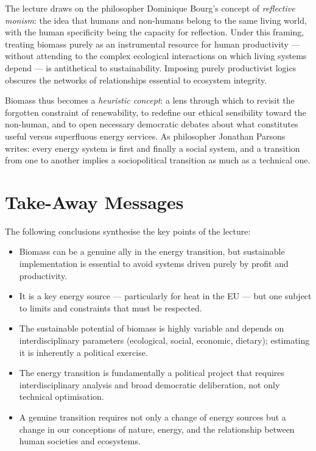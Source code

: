 The lecture draws on the philosopher Dominique Bourg's concept of \textit{reflective monism}: the idea that humans and non-humans belong to the same living world, with the human specificity being the capacity for reflection. Under this framing, treating biomass purely as an instrumental resource for human productivity — without attending to the complex ecological interactions on which living systems depend — is antithetical to sustainability. Imposing purely productivist logics obscures the networks of relationships essential to ecosystem integrity.

Biomass thus becomes a \textit{heuristic concept}: a lens through which to revisit the forgotten constraint of renewability, to redefine our ethical sensibility toward the non-human, and to open necessary democratic debates about what constitutes useful versus superfluous energy services. As philosopher Jonathan Parsons writes: every energy system is first and finally a social system, and a transition from one to another implies a sociopolitical transition as much as a technical one.

\section{Take-Away Messages}

The following conclusions synthesise the key points of the lecture:

\begin{itemize}
    \item Biomass can be a genuine ally in the energy transition, but sustainable implementation is essential to avoid systems driven purely by profit and productivity.
    \item It is a key energy source — particularly for heat in the EU — but one subject to limits and constraints that must be respected.
    \item The sustainable potential of biomass is highly variable and depends on interdisciplinary parameters (ecological, social, economic, dietary); estimating it is inherently a political exercise.
    \item The energy transition is fundamentally a political project that requires interdisciplinary analysis and broad democratic deliberation, not only technical optimisation.
    \item A genuine transition requires not only a change of energy sources but a change in our conceptions of nature, energy, and the relationship between human societies and ecosystems.
\end{itemize}



